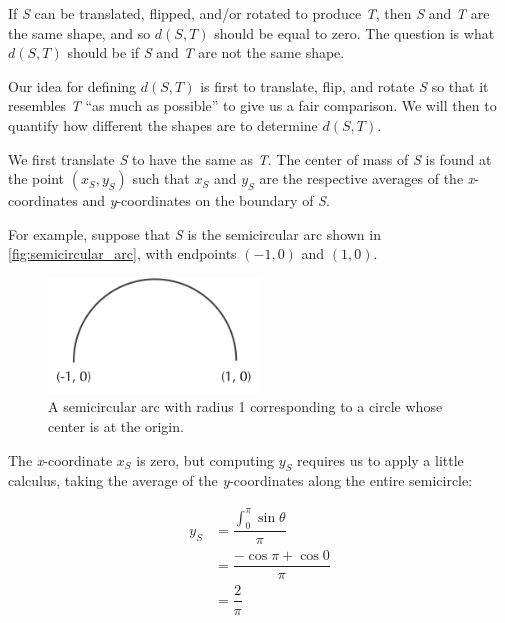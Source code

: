 If \textit{S} can be translated, flipped, and/or rotated to produce \textit{T}, then \textit{S} and \textit{T} are the same shape, and so $d(S, T)$ should be equal to zero. The question is what $d(S, T)$ should be if \textit{S} and \textit{T} are not the same shape.

Our idea for defining $d(S, T)$ is first to translate, flip, and rotate \textit{S} so that it resembles \textit{T} ``as much as possible'' to give us a fair comparison. We will then to quantify how different the shapes are to determine $d(S, T)$.

We first translate \textit{S} to have the same  as \textit{T}. The center of mass of \textit{S} is found at the point $(x_{S}, y_{S})$ such that $x_{S}$ and $y_{S}$ are the respective averages of the \textit{x}-coordinates and \textit{y}-coordinates on the boundary of \textit{S}.

For example, suppose that \textit{S} is the semicircular arc shown in \autoref{fig:semicircular_arc}, with endpoints $(-1, 0)$ and $(1, 0)$.

\begin{figure}[h]
	\centering
	\mySfFamily
	\includegraphics[width = 0.5\textwidth]{../images/semicircular_arc.png}
	\caption{A semicircular arc with radius 1 corresponding to a circle whose center is at the origin.}
	\label{fig:semicircular_arc}
\end{figure}

The \textit{x}-coordinate $x_{S}$ is zero, but computing $y_{S}$ requires us to apply a little calculus, taking the average of the \textit{y}-coordinates along the entire semicircle:

\begin{align*}
	y_S &= \dfrac{\int_{0}^{\pi}{\sin{\theta}}}{\pi} \\
	&= \dfrac{-\cos{\pi} + \cos{0}}{\pi} \\
	&= \dfrac{2}{\pi}
\end{align*}



